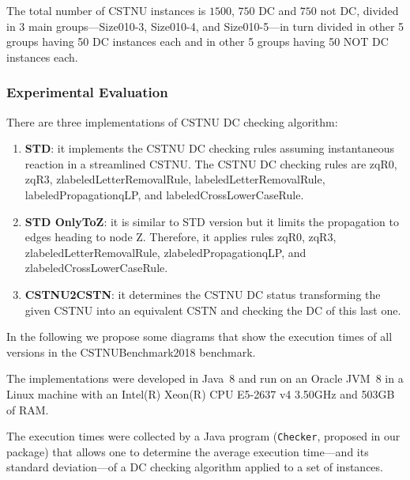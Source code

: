 \documentclass[a4paper,11pt]{article}
\begin{document}
The total number of CSTNU instances is $1500$, $750$ DC and $750$ not DC, divided in 3 main groups---Size010-3, Size010-4, and Size010-5---in turn divided in other 5 groups having 50 DC instances each and in other 5 groups having 50 NOT DC instances each.


\subsubsection{Experimental Evaluation}

There are three implementations of CSTNU DC checking algorithm:
\begin{enumerate}
	\item \textbf{STD}: it implements the CSTNU DC checking rules assuming instantaneous reaction in a streamlined CSTNU. The CSTNU DC checking rules are zqR0, zqR3, zlabeledLetterRemovalRule,
	labeledLetterRemovalRule, labeledPropagationqLP, and labeledCrossLowerCaseRule.

	\item \textbf{STD OnlyToZ}: it is similar to STD version but it limits the propagation to edges heading to node Z. Therefore, it applies rules zqR0, zqR3, zlabeledLetterRemovalRule,
	zlabeledPropagationqLP, and zlabeledCrossLowerCaseRule.

	\item \textbf{CSTNU2CSTN}: it determines the CSTNU DC status transforming the given CSTNU into an equivalent CSTN and checking the DC of this last one.
\end{enumerate}
In the following we propose some diagrams that show the execution times of all versions in the CSTNUBenchmark2018 benchmark.

The implementations were developed in Java~8 and run on an Oracle JVM~8 in a Linux machine with an Intel(R) Xeon(R) CPU E5-2637 v4 \@ 3.50GHz and 503GB of RAM.

The execution times were collected by a Java program (\texttt{Checker}, proposed in our package) that allows one to determine the average execution time---and its standard deviation---of a DC checking algorithm applied to a set of instances.
\end{document}
